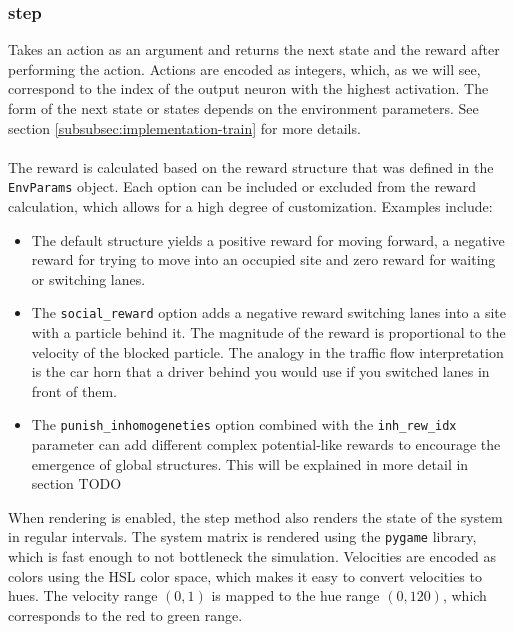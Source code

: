 \subsubsection{step}
\label{subsubsec:implementation-step}
Takes an action as an argument and returns the next state and the reward after performing the action. Actions are encoded as integers, which, as we will see, correspond to the index of the output neuron with the highest activation. The form of the next state or states depends on the environment parameters. See section \ref{subsubsec:implementation-train} for more details.
\\
\\
The reward is calculated based on the reward structure that was defined in the \texttt{EnvParams} object. Each option can be included or excluded from the reward calculation, which allows for a high degree of customization. Examples include:
\begin{itemize}
    \item The default structure yields a positive reward for moving forward, a negative reward for trying to move into an occupied site and zero reward for waiting or switching lanes. 
    \item The \texttt{social\_reward} option adds a negative reward switching lanes into a site with a particle behind it. The magnitude of the reward is proportional to the velocity of the blocked particle. The analogy in the traffic flow interpretation is the car horn that a driver behind you would use if you switched lanes in front of them.
    \item The \texttt{punish\_inhomogeneties} option combined with the \texttt{inh\_rew\_idx} parameter can add different complex potential-like rewards to encourage the emergence of global structures. This will be explained in more detail in section TODO
\end{itemize}
When rendering is enabled, the step method also renders the state of the system in regular intervals. The system matrix is rendered using the \texttt{pygame} library, which is fast enough to not bottleneck the simulation. Velocities are encoded as colors using the HSL color space, which makes it easy to convert velocities to hues. The velocity range $(0,1)$ is mapped to the hue range $(0,120)$, which corresponds to the red to green range. 



